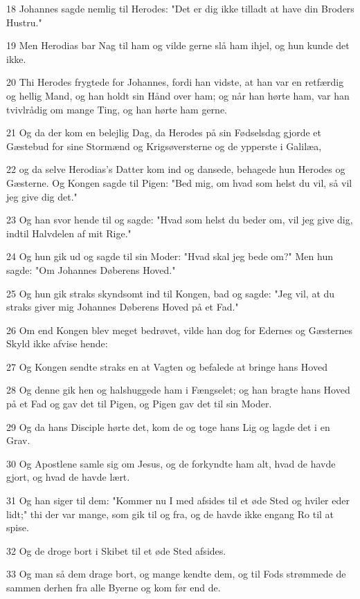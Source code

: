 \par 18 Johannes sagde nemlig til Herodes: "Det er dig ikke tilladt at have din Broders Hustru."
\par 19 Men Herodias bar Nag til ham og vilde gerne slå ham ihjel, og hun kunde det ikke.
\par 20 Thi Herodes frygtede for Johannes, fordi han vidste, at han var en retfærdig og hellig Mand, og han holdt sin Hånd over ham; og når han hørte ham, var han tvivlrådig om mange Ting, og han hørte ham gerne.
\par 21 Og da der kom en belejlig Dag, da Herodes på sin Fødselsdag gjorde et Gæstebud for sine Stormænd og Krigsøversterne og de ypperste i Galilæa,
\par 22 og da selve Herodias's Datter kom ind og dansede, behagede hun Herodes og Gæsterne. Og Kongen sagde til Pigen: "Bed mig, om hvad som helst du vil, så vil jeg give dig det."
\par 23 Og han svor hende til og sagde: "Hvad som helst du beder om, vil jeg give dig, indtil Halvdelen af mit Rige."
\par 24 Og hun gik ud og sagde til sin Moder: "Hvad skal jeg bede om?" Men hun sagde: "Om Johannes Døberens Hoved."
\par 25 Og hun gik straks skyndsomt ind til Kongen, bad og sagde: "Jeg vil, at du straks giver mig Johannes Døberens Hoved på et Fad."
\par 26 Om end Kongen blev meget bedrøvet, vilde han dog for Edernes og Gæsternes Skyld ikke afvise hende:
\par 27 Og Kongen sendte straks en at Vagten og befalede at bringe hans Hoved
\par 28 Og denne gik hen og halshuggede ham i Fængselet; og han bragte hans Hoved på et Fad og gav det til Pigen, og Pigen gav det til sin Moder.
\par 29 Og da hans Disciple hørte det, kom de og toge hans Lig og lagde det i en Grav.
\par 30 Og Apostlene samle sig om Jesus, og de forkyndte ham alt, hvad de havde gjort, og hvad de havde lært.
\par 31 Og han siger til dem: "Kommer nu I med afsides til et øde Sted og hviler eder lidt;" thi der var mange, som gik til og fra, og de havde ikke engang Ro til at spise.
\par 32 Og de droge bort i Skibet til et øde Sted afsides.
\par 33 Og man så dem drage bort, og mange kendte dem, og til Fods strømmede de sammen derhen fra alle Byerne og kom før end de.
